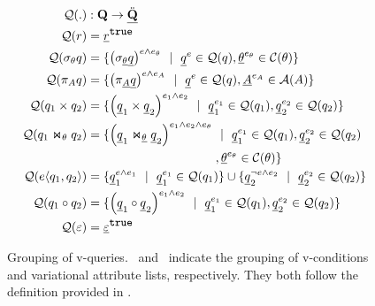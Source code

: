 \begin{figure}
\begin{alignat*}{1}
\qGroup . &: \qSet \to \ddot \pQSet\\
%
\qGroup \vRel &= \annot [\t] \pRel\\
\qGroup {\vSel \vQ}  &=  
\setDef {\annot [\dimMeta \wedge \dimMeta_\vCond] {\left(\sigma_{\pCond} \pQ\right)} \myOR
\annot \pQ \in \qGroup \vQ, \annot [\dimMeta_\vCond] \pCond \in \cGroup}
\\
%
\qGroup {\vPrj [\vAttList] \vQ} &= 
\setDef {\annot [\dimMeta \wedge \dimMeta_\vAttList] {\left(\pi_{\pAttList} \pQ \right)} \myOR
\annot \pQ \in \qGroup \vQ, \annot [\dimMeta_\vAttList] \pAttList \in \aGroup}
\\
%
\qGroup {{\vQ_1} \times {\vQ_2}} &= 
\setDef {\annot [\dimMeta_1 \wedge \dimMeta_2] {\left(\pQ_1 \times \pQ_2\right)} \myOR
\annot [\dimMeta_1] \pQ_1 \in \qGroup {\vQ_1}, \annot [\dimMeta_2] \pQ_2 \in \qGroup {\vQ_2} }
\\
%
\qGroup {{\vQ_1} \Join_\vCond {\vQ_2}} &= 
\setDef {\annot [\dimMeta_1 \wedge \dimMeta_2 \wedge \dimMeta_\vCond] {\left(\pQ_1 \Join_{\pCond} \pQ_2 \right)} \myOR 
\annot [\dimMeta_1] \pQ_1 \in \qGroup {\vQ_1}, \annot [\dimMeta_2] \pQ_2 \in \qGroup {\vQ_2}\\
& \hspace{104pt}
,\annot [\dimMeta_\vCond] \pCond \in \cGroup  }
\\
%
\qGroup {\chc {\vQ_1, \vQ_2}} &= 
\setDef {\annot [\dimMeta \wedge \dimMeta_1] \pQ_1 \myOR  \annot [\dimMeta_1] \pQ_1 \in \qGroup {\vQ_1} }
\cup 
\setDef {\annot [\neg \dimMeta \wedge \dimMeta_2] \pQ_2 \myOR  \annot [\dimMeta_2] \pQ_2 \in \qGroup {\vQ_2}}  \\
%
\qGroup {{\vQ_1} \circ {\vQ_2}} &= 
\setDef {\annot [\dimMeta_1 \wedge \dimMeta_2] {\left(\pQ_1 \circ \pQ_2\right)} \myOR
\annot [\dimMeta_1] \pQ_1 \in \qGroup {\vQ_1}, \annot [\dimMeta_2] \pQ_2 \in \qGroup {\vQ_2} }\\
%
\qGroup {\empRel} &= \annot [\t] {\underline \empRel}
\end{alignat*}
\caption[]{Grouping of v-queries. \cGroup\ and \aGroup\ indicate the grouping of v-conditions and
variational attribute lists, respectively. They both follow the definition provided in 
.
}
\label{fig:vq-group}
\end{figure}
